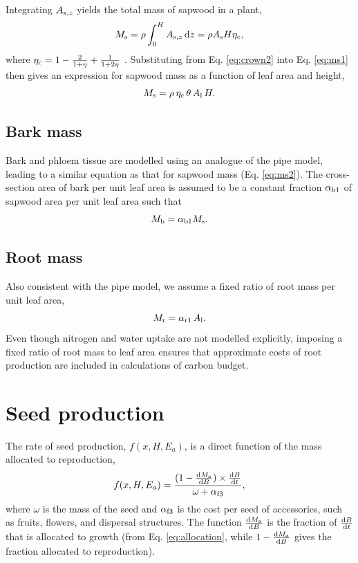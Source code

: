 \documentclass[10pt,twoside]{article}
\begin{document}
Integrating \(A_{{\rm s},z}\) yields the total mass of
sapwood in a plant,
\begin{equation}\label{eq:ms1}
M_{\rm s}  = \rho \int_0^H A_{{\rm s},z} \, {\rm d}z = \rho A_{\rm s} H \eta_{\rm c} ,
\end{equation}
where \(\eta_{\rm c} = 1 - \frac{2}{1 + \eta} + \frac{1}{1 + 2\eta}\)
\citep{Yokozawa-1995}. Substituting from Eq. \ref{eq:crown2}  into Eq.
\ref{eq:ms1} then gives an expression for sapwood mass as a function of
leaf area and height,
\begin{equation}\label{eq:ms2}
M_{\rm s} = \rho \, \eta_{\rm c} \, \theta \, A_{\rm l}  \, H.
\end{equation}

\subsection{Bark mass}\label{bark-mass}

Bark and phloem tissue are modelled using an analogue of the pipe model,
leading to a similar equation as that for sapwood mass (Eq.
\ref{eq:ms2}). The cross-section area of bark per unit leaf area is
assumed to be a constant fraction \(\alpha_{{\rm b1}}\) of sapwood area per unit leaf
area such that
\begin{equation}\label{eq:mb}
M_{\rm b} = \alpha_{{\rm b1}} M_{\rm s}.
\end{equation}

\subsection{Root mass}\label{root-mass}

Also consistent with the pipe model, we assume a fixed ratio of
root mass per unit leaf area,
\begin{equation}\label{eq:mr}
M_{\rm r} = \alpha_{{\rm r1}} \, A_{\rm l}.
\end{equation}
Even though nitrogen and water uptake are not modelled explicitly,
imposing a fixed ratio of root mass to leaf area ensures that
approximate costs of root production are included in calculations of
carbon budget.

\section{Seed production}\label{seed-production}

The rate of seed production, \(f(x, H, E_{a})\), is a direct
function of the mass allocated to reproduction,
\begin{equation}\label{eq:fecundity}
f(x, H, E_{a}) = \frac{(1 - \frac{{\rm d}M_{\rm a}}{{\rm d}B}) \times \frac{{\rm d}B}{{\rm d}t}}{
\omega + \alpha_{{\rm f3}}},
\end{equation}
where \(\omega\) is the mass of the seed and \(\alpha_{{\rm f3}}\) is the cost
per seed of accessories, such as fruits, flowers, and dispersal
structures. The function $\frac{{\rm d}M_{\rm a}}{{\rm d}B}$ is the fraction
of $\frac{{\rm d}B}{{\rm d}t}$ that is allocated to growth (from Eq. \ref{eq:allocation}, while
$1-\frac{{\rm d}M_{\rm a}}{{\rm d}B}$ gives the fraction allocated
to reproduction).
\end{document}
